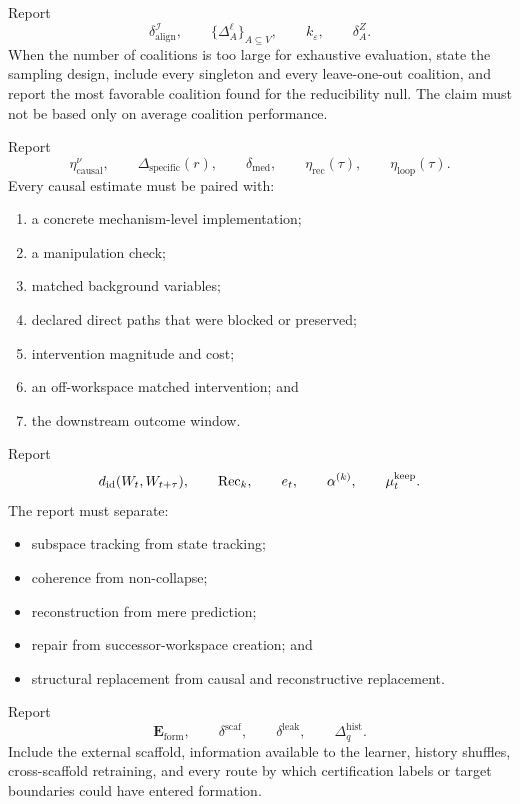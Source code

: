 
Report
\[
\delta_{\mathrm{align}}^{\mathcal I},
\qquad
\{\Delta_A^\ell\}_{A\subseteq V},
\qquad
 k_\varepsilon,
\qquad
\delta_A^Z.
\]
When the number of coalitions is too large for exhaustive evaluation, state the
sampling design, include every singleton and every leave-one-out coalition,
and report the most favorable coalition found for the reducibility null. The
claim must not be based only on average coalition performance.


Report
\[
\eta_{\mathrm{causal}}^\nu,
\qquad
\Delta_{\mathrm{specific}}(r),
\qquad
\delta_{\mathrm{med}},
\qquad
\eta_{\mathrm{rec}}(\tau),
\qquad
\eta_{\mathrm{loop}}(\tau).
\]
Every causal estimate must be paired with:
\begin{enumerate}
\item a concrete mechanism-level implementation;
\item a manipulation check;
\item matched background variables;
\item declared direct paths that were blocked or preserved;
\item intervention magnitude and cost;
\item an off-workspace matched intervention; and
\item the downstream outcome window.
\end{enumerate}


Report
\[
d_{\mathrm{id}}(W_t,W_{t+\tau}),
\qquad
\operatorname{Rec}_k,
\qquad
 e_t,
\qquad
\alpha^{(k)},
\qquad
\mu_t^{\mathrm{keep}}.
\]
The report must separate:
\begin{itemize}
\item subspace tracking from state tracking;
\item coherence from non-collapse;
\item reconstruction from mere prediction;
\item repair from successor-workspace creation; and
\item structural replacement from causal and reconstructive replacement.
\end{itemize}


Report
\[
\mathbf E_{\mathrm{form}},
\qquad
\delta^{\mathrm{scaf}},
\qquad
\delta^{\mathrm{leak}},
\qquad
\Delta_q^{\mathrm{hist}}.
\]
Include the external scaffold, information available to the learner, history
shuffles, cross-scaffold retraining, and every route by which certification
labels or target boundaries could have entered formation.

